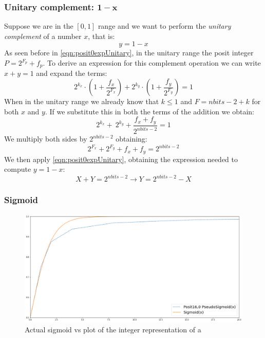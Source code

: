 \subsubsection{Unitary complement: $\mathbf{1-x}$}

Suppose we are in the $[0,1]$ range and we want to perform the \textit{unitary complement} of a number $x$, that is:
\begin{equation}
    y = 1 - x    
\end{equation}
As seen before in \eqref{eqn:posit0expUnitary}, in the unitary range the posit integer $P = 2^{F_p} + f_p$. 
To derive an expression for this complement operation we can write $x + y = 1$ and expand the terms:
\begin{equation}
    2^{k_x} \cdot \left(1 + \frac{f_x}{2^{F_x}} \right) + 2^{k_y} \cdot \left(1 + \frac{f_y}{2^{F_y}} \right) = 1
\end{equation}
When in the unitary range we already know that $k \leq 1$ and $F = nbits - 2 + k$ for both $x$ and $y$. If we substitute this in both the terms of the addition we obtain:
\begin{equation}
    2^{k_x} + \ 2^{k_y} + \frac{f_x + f_y}{2^{nbits - 2}} = 1
\end{equation}
We multiply both sides by $2^{nbits - 2}$ obtaining:
\begin{equation}
    2^{F_x} + 2^{F_y} + f_x + f_y = 2^{nbits - 2}
\end{equation}
We then apply  \eqref{eqn:posit0expUnitary}, obtaining the expression needed to compute $y = 1 - x$:
\begin{equation}
    X + Y = 2^{nbits - 2} \xrightarrow{} Y = 2^{nbits - 2} - X
\end{equation}



\subsubsection{Sigmoid}
\begin{figure}
    \centering
    \includegraphics[width=\linewidth]{img/sigmoidPosit160.png}
    \caption{Actual sigmoid vs plot of the integer representation of a }
    \label{fig:posit160Sigmoid}
\end{figure}

